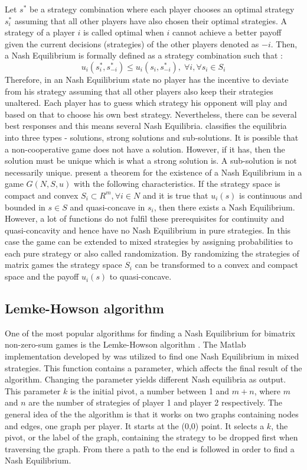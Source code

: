 {Let $s^*$ be a strategy combination where each player chooses an optimal strategy $s_i^*$ assuming that all other players have also chosen their optimal strategies. A strategy of a player $i$ is called optimal when $i$ cannot achieve a better payoff given the current decisions (strategies) of the other players denoted as $-i$. Then, a Nash Equilibrium is formally defined as a strategy combination such that \citep{holler2006einfuhrung}:
\begin{equation}
u_i(s_i^*, s_{-i}^*) \leq u_i(s_i,s_{-i}^*), \; \forall i, \forall s_i \in S_i
\end{equation}
Therefore, in an Nash Equilibrium state no player has the incentive to deviate from his strategy assuming that all other players also keep their strategies unaltered. Each player has to guess which strategy his opponent will play and based on that to choose his own best strategy. Nevertheless, there can be several best responses and this means several Nash Equilibria. \citet{nash1950equilibrium} classifies the equilibria into three types - solutions, strong solutions and sub-solutions. It is possible that a non-cooperative game does not have a solution. However, if it has, then the solution must be unique which is what a strong solution is. A sub-solution is not necessarily unique. \citet{holler2006einfuhrung} present a theorem for the existence of a Nash Equilibrium in a game $G(N,S,u)$ with the following characteristics. If the strategy space is compact and convex $S_i \subset R^m, \forall i \in N$ and it is true that $u_i(s)$ is continuous and bounded in $s \in S$ and quasi-concave in $s_i$, then there exists a Nash Equilibrium. However, a lot of functions do not fulfil these prerequisites for continuity and quasi-concavity and hence have no Nash Equilibrium in pure strategies. In this case the game can be extended to mixed strategies by assigning probabilities to each pure strategy or also called randomization. By randomizing the strategies of matrix games the strategy space $S_i$ can be transformed to a convex and compact space and the payoff $u_i(s)$ to quasi-concave.  

\subsection{Lemke-Howson algorithm}
\label{subsec:lemkehowson}
One of the most popular algorithms for finding a Nash Equilibrium for bimatrix non-zero-sum games is the Lemke-Howson algorithm \citep{lemke1964equilibrium}. The Matlab implementation developed by \citet{lemkeHowson2014Matlab} was utilized to find one Nash Equilibrium in mixed strategies. This function contains a parameter, which affects the final result of the algorithm. Changing the parameter yields different Nash equilibria as output. This parameter $k$ is the initial pivot, a number between 1 and $m+n$, where $m$ and $n$ are the number of strategies of player 1 and player 2 respectively. The general idea of the the algorithm is that it works on two graphs containing nodes and edges, one graph per player. It starts at the (0,0) point. It selects a $k$, the pivot, or the label of the graph, containing the strategy to be dropped first when traversing the graph. From there a path to the end is followed in order to find a Nash Equilibrium. 

}
